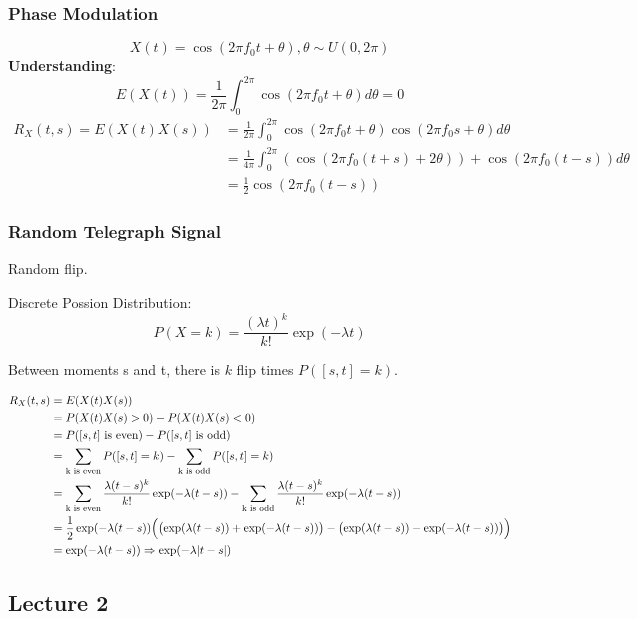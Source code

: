 \documentclass[a4paper]{article}
\begin{document}
\subsubsection*{Phase Modulation}
$$X(t)=\cos(2\pi f_0t + \theta), \theta\sim U(0, 2\pi)$$
\textbf{Understanding}:
$$E(X(t)) = \frac{1}{2\pi}\int_0^{2\pi}\cos(2\pi f_0t + \theta)d\theta=0$$
$$\begin{aligned}
  R_X(t,s)=E(X(t)X(s)) &=\frac{1}{2\pi}\int_0^{2\pi}\cos(2\pi f_0t + \theta)\cos(2\pi f_0s + \theta)d\theta \\ &=\frac{1}{4\pi}\int_0^{2\pi}\left(\cos(2\pi f_0(t+s) + 2\theta)\right) + \cos(2\pi f_0(t-s))d\theta \\ &=\frac 12\cos(2\pi f_0(t-s))
\end{aligned}$$

\subsubsection*{Random Telegraph Signal}

Random flip.

Discrete Possion Distribution:
$$P(X=k)=\frac{(\lambda t)^k}{k!}\exp(-\lambda t)$$

Between moments s and t, there is $k$ flip times $P([s, t]=k)$.

$$\begin{aligned}
  R_X(t,s)&=E(X(t)X(s)) \\
          &=P(X(t)X(s)>0) - P(X(t)X(s)<0)\\
          &=P([s,t]\text{ is even}) - P([s,t]\text{ is odd})\\
          &=\sum_{\text{k is even}}P([s,t]=k) -\sum_{\text{k is odd}}P([s,t]=k) \\
          &=\sum_{\text{k is even}}\frac{\lambda(t-s)^k}{k!}\exp(-\lambda(t-s)) - \sum_{\text{k is odd}}\frac{\lambda(t-s)^k}{k!}\exp(-\lambda(t-s))\\
          &=\frac 12\exp(-\lambda(t-s))\Bigl(\bigl(\exp(\lambda(t-s))+\exp(-\lambda(t-s))\bigr)-\bigl(\exp(\lambda(t-s))-\exp(-\lambda(t-s))\bigr)\Bigr)\\
          &=\exp(-\lambda(t-s))\Rightarrow \exp(-\lambda|t-s|)
\end{aligned}$$

\subsection*{Lecture 2}
\end{document}
